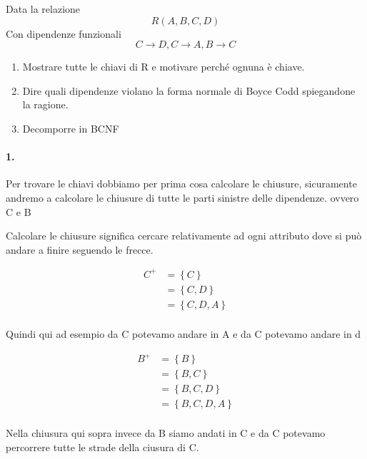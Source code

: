\begin{exmp}
    Data la relazione 
    \[R(A,B,C,D)\]
    Con dipendenze funzionali
    \[ C \rightarrow D,C \rightarrow A,B \rightarrow C \]
    
    \begin{enumerate}
        \item Mostrare tutte le chiavi di R e motivare perché ognuna è chiave.
        \item Dire quali dipendenze violano la forma normale di Boyce Codd spiegandone la ragione.
        \item Decomporre in BCNF
    \end{enumerate}
    
    \paragraph{1.} Per trovare le chiavi dobbiamo per prima cosa calcolare le chiusure, sicuramente andremo a calcolare le chiusure di tutte le parti sinistre delle dipendenze. ovvero C e B

    Calcolare le chiusure significa cercare relativamente ad ogni attributo dove si può andare a finire seguendo le frecce.

    \begin{equation} \label{eq1}
        \begin{split}
            C^+&= \left\{ C \right\} \\
            &= \left\{ C,D \right\}  \\
            &= \left\{ C,D,A \right\}  \\
        \end{split}
    \end{equation}

    Quindi qui ad esempio da C potevamo andare in A e da C potevamo andare in d

    \begin{equation} \label{eq1}
        \begin{split}
            B^+&= \left\{  B \right\}\\
            &= \left\{  B,C \right\}\\
            &= \left\{  B,C,D \right\}\\
            &= \left\{  B,C,D,A \right\}\\
        \end{split}
    \end{equation}

    Nella chiusura qui sopra invece da B siamo andati in C e da C potevamo percorrere tutte le strade della ciusura di C.


\end{exmp}
